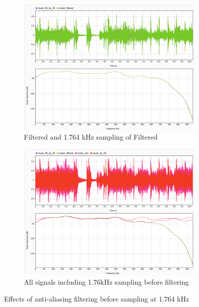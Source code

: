 \documentclass[12pt]{article}
\begin{document}
\begin{figure}[htbp]
  \centering
  \begin{subfigure}[b]{0.48\textwidth} %
    \includegraphics[width=\linewidth]{labs/lab1/lab-report-tex/figures/SigAnalyzer/PArt C/ps_filt25_filt.png}
    \caption{Filtered and 1.764 kHz sampling of Filtered}
    \label{fig:f2}
  \end{subfigure}
  \begin{subfigure}[b]{0.48\textwidth} %
    \includegraphics[width=\linewidth]{labs/lab1/lab-report-tex/figures/SigAnalyzer/PArt C/ps_all_signals_filt.png}
    \caption{All signals including 1.76kHz sampling before filtering}
    \label{fig:f2}
  \end{subfigure}
  \caption{Effects of anti-aliasing filtering before sampling at 1.764 kHz}
\end{figure}
\FloatBarrier
\end{document}
